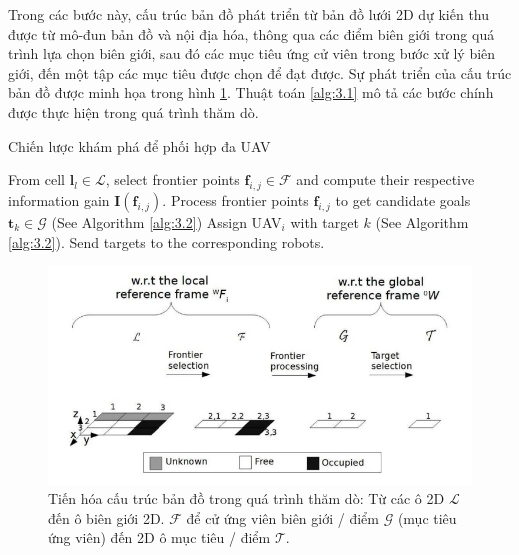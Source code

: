 \documentclass[11pt,openany]{book}
\begin{document}
Trong các bước này, cấu trúc bản đồ phát triển từ bản đồ lưới 2D dự kiến thu được từ mô-đun bản đồ và nội địa hóa, thông qua các điểm biên giới trong quá trình lựa chọn biên giới, sau đó các mục tiêu ứng cử viên trong bước xử lý biên giới, đến một tập các mục tiêu được chọn để đạt được. Sự phát triển của cấu trúc bản đồ được minh họa trong hình \ref{fig:3.2}. Thuật toán \ref{alg:3.1} mô tả các bước chính được thực hiện trong quá trình thăm dò.
\begin{algorithm}
    \caption{Chiến lược khám phá để phối hợp đa UAV}
    \label{alg:3.1}
    \begin{algorithmic}[1]
        \STATE From cell $\mathbf{l}_l \in \mathcal{L}$, select frontier points $\mathbf{f}_{i,j} \in \mathcal{F}$ and compute their respective information gain $\mathit{\mathbf{I}}(\mathbf{f}_{i,j})$.
        \STATE Process frontier points $\mathbf{f}_{i,j}$ to get candidate goals $\mathbf{t}_k \in \mathcal{G}$ (See Algorithm \ref{alg:3.2})
        \STATE Assign UAV$_i$ with target $k$ (See Algorithm \ref{alg:3.2}).
        \STATE Send targets to the corresponding robots.
    \end{algorithmic}
\end{algorithm}
\begin{figure}[H]
    \centering
    \includegraphics[scale=0.4]{assets/3_2.png}
    \caption{Tiến hóa cấu trúc bản đồ trong quá trình thăm dò: Từ các ô 2D $\mathcal{L}$ đến ô biên giới 2D. $\mathcal{F}$ để  cử  ứng viên biên giới / điểm $\mathcal{G}$ (mục tiêu ứng viên) đến 2D ô mục tiêu / điểm $\mathcal{T}$.}
    \label{fig:3.2}
\end{figure}
\end{document}

